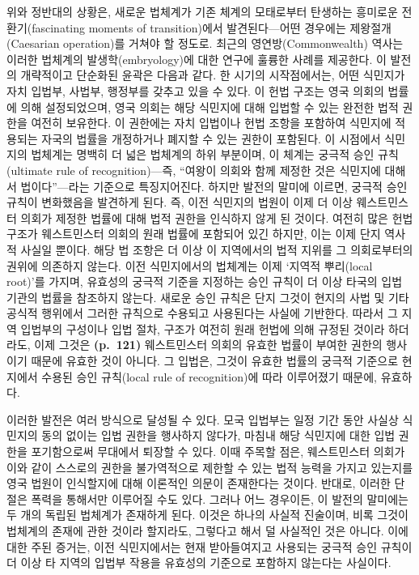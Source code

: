 위와 정반대의 상황은, 새로운 법체계가 기존 체계의 모태로부터 탄생하는
흥미로운 전환기(fascinating moments of transition)에서 발견된다---어떤
경우에는 제왕절개(Caesarian operation)를 거쳐야 할 정도로. 최근의
영연방(Commonwealth) 역사는 이러한 법체계의 발생학(embryology)에 대한
연구에 훌륭한 사례를 제공한다. 이 발전의 개략적이고 단순화된 윤곽은
다음과 같다. 한 시기의 시작점에서는, 어떤 식민지가 자치 입법부, 사법부,
행정부를 갖추고 있을 수 있다. 이 헌법 구조는 영국 의회의 법률에 의해
설정되었으며, 영국 의회는 해당 식민지에 대해 입법할 수 있는 완전한 법적
권한을 여전히 보유한다. 이 권한에는 자치 입법이나 헌법 조항을 포함하여
식민지에 적용되는 자국의 법률을 개정하거나 폐지할 수 있는 권한이
포함된다. 이 시점에서 식민지의 법체계는 명백히 더 넓은 법체계의 하위
부분이며, 이 체계는 궁극적 승인 규칙(ultimate rule of recognition)---즉,
``여왕이 의회와 함께 제정한 것은  식민지에
대해서 법이다''---라는 기준으로 특징지어진다. 하지만 발전의 말미에
이르면, 궁극적 승인 규칙이 변화했음을 발견하게 된다. 즉, 이전 식민지의
법원이 이제 더 이상 웨스트민스터 의회가 제정한 법률에 대해 법적 권한을
인식하지 않게 된 것이다. 여전히 많은 헌법 구조가 웨스트민스터 의회의
원래 법률에 포함되어 있긴 하지만, 이는 이제 단지 역사적 사실일 뿐이다.
해당 법 조항은 더 이상 이 지역에서의 법적 지위를 그 의회로부터의 권위에
의존하지 않는다. 이전 식민지에서의 법체계는 이제 `지역적 뿌리(local
root)'를 가지며, 유효성의 궁극적 기준을 지정하는 승인 규칙이 더 이상
타국의 입법 기관의 법률을 참조하지 않는다. 새로운 승인 규칙은 단지
그것이 현지의 사법 및 기타 공식적 행위에서 그러한 규칙으로 수용되고
사용된다는 사실에 기반한다. 따라서 그 지역 입법부의 구성이나 입법 절차,
구조가 여전히 원래 헌법에 의해 규정된 것이라 하더라도, 이제 그것은
\textbf{(p.~121)} 웨스트민스터 의회의 유효한 법률이 부여한 권한의
행사이기 때문에 유효한 것이 아니다. 그 입법은, 그것이 유효한 법률의
궁극적 기준으로 현지에서 수용된 승인 규칙(local rule of recognition)에
따라 이루어졌기 때문에, 유효하다.

이러한 발전은 여러 방식으로 달성될 수 있다. 모국 입법부는 일정 기간 동안
사실상 식민지의 동의 없이는 입법 권한을 행사하지 않다가, 마침내 해당
식민지에 대한 입법 권한을 포기함으로써 무대에서 퇴장할 수 있다. 이때
주목할 점은, 웨스트민스터 의회가 이와 같이 스스로의 권한을 불가역적으로
제한할 수 있는 법적 능력을 가지고 있는지를 영국 법원이 인식할지에 대해
이론적인 의문이 존재한다는 것이다. 반대로, 이러한 단절은 폭력을 통해서만
이루어질 수도 있다. 그러나 어느 경우이든, 이 발전의 말미에는 두 개의
독립된 법체계가 존재하게 된다. 이것은 하나의 사실적 진술이며, 비록
그것이 법체계의 존재에 관한 것이라 할지라도, 그렇다고 해서 덜 사실적인
것은 아니다. 이에 대한 주된 증거는, 이전 식민지에서는 현재 받아들여지고
사용되는 궁극적 승인 규칙이 더 이상 타 지역의 입법부 작용을 유효성의
기준으로 포함하지 않는다는 사실이다.

